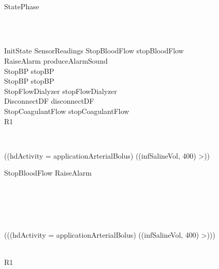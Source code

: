 \begin{circus}
\begin{block}
\begin{block}
\begin{block}
				\end{block}\\
				 \circseq StatePhase
			\end{block}\\
			
	\end{block}\\
	
	InitState \circdef SensorReadings
	StopBloodFlow \circdef stopBloodFlow \then \Skip\\
	RaiseAlarm \circdef produceAlarmSound \then \Skip\\
	StopBP \circdef stopBP \then \Skip\\
	StopBP \circdef stopBP \then \Skip\\
	StopFlowDialyzer \circdef stopFlowDialyzer \then \Skip\\
	DisconnectDF \circdef disconnectDF \then \Skip\\
	StopCoagulantFlow \circdef stopCoagulantFlow \then \Skip\\
	R1 \circdef \\
	\begin{block}
		\\
			\begin{block}
				\lcircguard ((hdActivity = {applicationArterialBolus}) \land ((infSalineVol, 400) \in >)) \rcircguard \circguard \\
					\begin{block}
						StopBloodFlow \interleave RaiseAlarm
					\end{block}\\
					
			\end{block}\\
			 \extchoice \\
			\begin{block}
				\lcircguard \lnot (((hdActivity = {applicationArterialBolus}) \land ((infSalineVol, 400) \in >))) \rcircguard \circguard \\
					\begin{block}
						\Skip\\ \circseq R1
					\end{block}\\
					
			\end{block}\\
			
	\end{block}\\
	

\end{circus}
